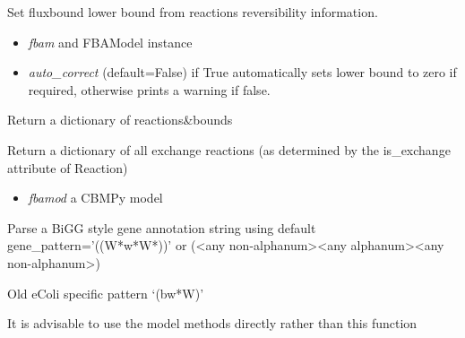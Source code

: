 \documentclass[a4paper,11pt,english]{sphinxmanual}
\begin{document}

\begin{fulllineitems}
\label{modules_doc:cbmpy.CBTools.fixReversibility}
Set fluxbound lower bound from reactions reversibility information.
\begin{itemize}
\item {} 
\emph{fbam} and FBAModel instance

\item {} 
\emph{auto\_correct} (default=False) if True automatically sets lower bound to zero if required, otherwise prints a warning if false.

\end{itemize}

\end{fulllineitems}


\begin{fulllineitems}
\label{modules_doc:cbmpy.CBTools.getBoundsDict}
Return a dictionary of reactions\&bounds

\end{fulllineitems}


\begin{fulllineitems}
\label{modules_doc:cbmpy.CBTools.getExchBoundsDict}
Return a dictionary of all exchange reactions (as determined by the is\_exchange attribute of Reaction)
\begin{itemize}
\item {} 
\emph{fbamod} a CBMPy model

\end{itemize}

\end{fulllineitems}


\begin{fulllineitems}
\label{modules_doc:cbmpy.CBTools.getModelGenesPerReaction}
Parse a BiGG style gene annotation string using default gene\_pattern='((W*w*W*))' or
(\textless{}any non-alphanum\textgreater{}\textless{}any alphanum\textgreater{}\textless{}any non-alphanum\textgreater{})

Old eColi specific pattern `(bw*W)'

It is advisable to use the model methods directly rather than this function

\end{fulllineitems}
\end{document}
